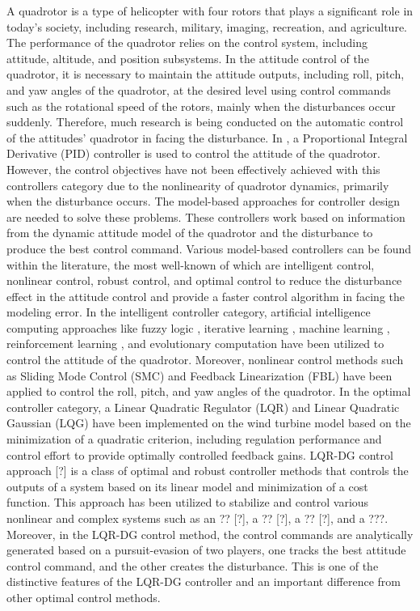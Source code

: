 \documentclass[conference]{IEEEtran}
\begin{document}
A quadrotor is a type of helicopter with four rotors that plays a significant role in today's society, including research, military, imaging, recreation, and agriculture. The performance of the quadrotor relies on the control system, including attitude, altitude, and position subsystems. In the attitude control of the quadrotor, it is necessary to maintain the attitude outputs, including roll, pitch, and yaw angles of the quadrotor, at the desired level using control commands such as the rotational speed of the rotors, mainly when the disturbances occur suddenly. Therefore, much research is being conducted on the automatic control of the attitudes' quadrotor in facing the disturbance.
     In \cite{PID}, a Proportional Integral Derivative (PID) controller is used to control the attitude of the quadrotor. However, the control objectives have not been effectively achieved with this controllers category due to the nonlinearity of quadrotor dynamics, primarily when the disturbance occurs. The model-based approaches \cite{model_base} for controller design are needed to solve these problems. These controllers work based on information from the dynamic attitude model of the quadrotor and the disturbance to produce the best control command.
     Various model-based controllers can be found within the literature, the most well-known of which are intelligent control, nonlinear control, robust control, and optimal control to reduce the disturbance effect in the attitude control and provide a faster control algorithm in facing the modeling error. In the intelligent controller category, artificial intelligence computing approaches like fuzzy logic \cite{fuzzy}, iterative learning \cite{iterative_Learning}, machine learning \cite{machine_learning}, reinforcement learning \cite{Reinforcement_Learning}, and evolutionary computation \cite{Evolutionary} have been utilized to control the attitude of the quadrotor.
     Moreover, nonlinear control methods such as Sliding Mode Control (SMC) \cite{SMC} and Feedback Linearization (FBL) \cite{FBL} have been applied to control the roll, pitch, and yaw angles of the quadrotor. In the optimal controller category, a Linear Quadratic Regulator (LQR) \cite{LQR} and Linear Quadratic Gaussian (LQG) \cite{LQG} have been implemented on the wind turbine model based on the minimization of a quadratic criterion, including regulation performance and control effort to provide optimally controlled feedback gains. 
     LQR-DG control approach [?] is a class of optimal and robust controller methods that controls the outputs of a system based on its linear model and minimization of a cost function. This approach has been utilized to stabilize and control various nonlinear and complex systems such as an ?? [?], a ?? [?], a ?? [?], and a ???. Moreover, in the LQR-DG control method, the control commands are analytically generated based on a pursuit-evasion of two players, one tracks the best attitude control command, and the other creates the disturbance. This is one of the distinctive features of the LQR-DG controller and an important difference from other optimal control methods.
\end{document}
